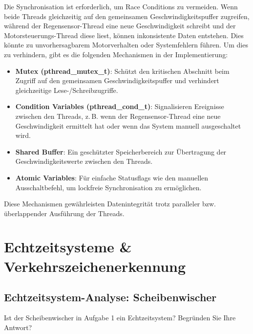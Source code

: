 \documentclass[
%
ngerman %
%
numeric %
]{wbh-assignment}
\begin{document}
Die Synchronisation ist erforderlich, um Race Conditions zu vermeiden.
Wenn beide Threads gleichzeitig auf den gemeinsamen Geschwindigkeitspuffer zugreifen, während der Regensensor-Thread eine neue Geschwindigkeit schreibt und der Motorsteuerungs-Thread diese liest, können inkonsistente Daten entstehen.
Dies könnte zu unvorhersagbarem Motorverhalten oder Systemfehlern führen.
Um dies zu verhindern, gibt es die folgenden Mechanismen in der Implementierung:

\begin{itemize}
  \item \textbf{Mutex (pthread\_mutex\_t)}: Schützt den kritischen Abschnitt beim Zugriff auf den gemeinsamen Geschwindigkeitspuffer und verhindert gleichzeitige Lese-/Schreibzugriffe.
  \item \textbf{Condition Variables (pthread\_cond\_t)}: Signalisieren Ereignisse zwischen den Threads, z.\,B. wenn der Regensensor-Thread eine neue Geschwindigkeit ermittelt hat oder wenn das System manuell ausgeschaltet wird.
  \item \textbf{Shared Buffer}: Ein geschützter Speicherbereich zur Übertragung der Geschwindigkeitswerte zwischen den Threads.
  \item \textbf{Atomic Variables}: Für einfache Statusflags wie den manuellen Ausschaltbefehl, um lockfreie Synchronisation zu ermöglichen.
\end{itemize}

Diese Mechanismen gewährleisten Datenintegrität trotz paralleler bzw. überlappender Ausführung der Threads.

\section{Echtzeitsysteme \& Verkehrszeichenerkennung}

\subsection{Echtzeitsystem-Analyse: Scheibenwischer}
\begin{aufgabenstellung}
Ist der Scheibenwischer in Aufgabe 1 ein Echtzeitsystem? Begründen Sie Ihre Antwort?
\end{aufgabenstellung}
\end{document}
